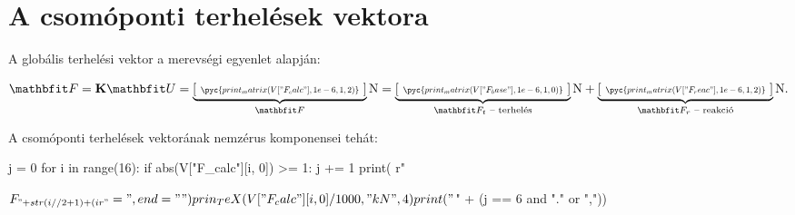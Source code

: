 \section{A csomóponti terhelések vektora}

A globális terhelési vektor a merevségi egyenlet alapján:
\begin{myframe}
  \begin{equation}
    \rvec F
    = \rmat K \rvec U
    =
    \siplaces{2} \sisetup{drop-zero-decimal}
    \underbrace{\left[
        \scalebox{.667}{$\begin{array}{c}
              \pyc{print_matrix(V["F_calc"], 1e-6, 1, 2)}
            \end{array}$}
        \right]}_{\rvec F}
    \mathrm N
    = \siplaces{0}
    \underbrace{\left[
        \scalebox{.667}{$\begin{array}{c}
              \pyc{print_matrix(V["F_base"], 1e-6, 1, 0)}
            \end{array}$}
        \right]}_{\rvec F_t \text{ -- terhelés}}
    \mathrm N
    + \siplaces{2}
    \underbrace{\left[
        \scalebox{.667}{$\begin{array}{c}
              \pyc{print_matrix(V["F_reac"], 1e-6, 1, 2)}
            \end{array}$}
        \right]}_{\rvec F_r \text{ -- reakció}}
    \mathrm N
    \text.
  \end{equation}
\end{myframe}

A csomóponti terhelések vektorának nemzérus komponensei tehát:
\begin{myframe}
  \vspace{-.66em}
  \begin{multicols}{3}
    \begin{itemize}
      \begin{python}
j = 0
for i in range(16):
    if abs(V["F_calc"][i, 0]) >= 1:
        j += 1
        print(
            r"\item $F_{" + str(i // 2 + 1) + 
            (i %
            r"} = ", end=""
        )
        prin_TeX(V["F_calc"][i, 0] / 1000, "kN", 4)
        print("$" + (j == 6 and "." or ","))
      \end{python}
    \end{itemize}
  \end{multicols}
\end{myframe}
